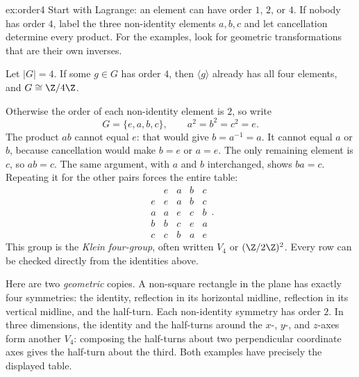 \begin{solution}{ex:order4}
\idea Start with Lagrange: an element can have order $1$, $2$, or $4$. If nobody has order $4$, label the three non-identity elements $a,b,c$ and let cancellation determine every product. For the examples, look for geometric transformations that are their own inverses.

\writeup Let $|G|=4$. If some $g\in G$ has order $4$, then $\langle g\rangle$ already has all four elements, and $G\cong\Z/4\Z$.

Otherwise the order of each non-identity element is $2$, so write
\[
G=\{e,a,b,c\},\qquad a^2=b^2=c^2=e.
\]
The product $ab$ cannot equal $e$: that would give $b=a^{-1}=a$. It cannot equal $a$ or $b$, because cancellation would make $b=e$ or $a=e$. The only remaining element is $c$, so $ab=c$. The same argument, with $a$ and $b$ interchanged, shows $ba=c$. Repeating it for the other pairs forces the entire table:
\[
\begin{array}{c|cccc}
 &e&a&b&c\\\hline
e&e&a&b&c\\
a&a&e&c&b\\
b&b&c&e&a\\
c&c&b&a&e
\end{array}.
\]
This group is the \emph{Klein four-group}, often written $V_4$ or $(\Z/2\Z)^2$. Every row can be checked directly from the identities above.

Here are two \emph{geometric} copies. A non-square rectangle in the plane has exactly four symmetries: the identity, reflection in its horizontal midline, reflection in its vertical midline, and the half-turn. Each non-identity symmetry has order $2$. In three dimensions, the identity and the half-turns around the $x$-, $y$-, and $z$-axes form another $V_4$: composing the half-turns about two perpendicular coordinate axes gives the half-turn about the third. Both examples have precisely the displayed table.
\end{solution}

